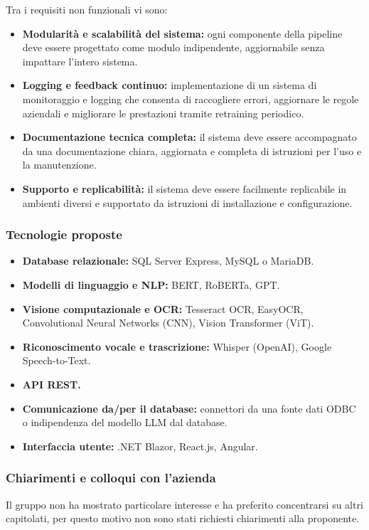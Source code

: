 \documentclass[a4paper,11pt]{article}
\begin{document}
Tra i requisiti non funzionali vi sono:
\begin{itemize}
 \item \textbf{Modularità e scalabilità del sistema:} ogni componente della pipeline deve essere progettato come modulo indipendente, aggiornabile senza impattare l'intero sistema.
 \item \textbf{Logging e feedback continuo:} implementazione di un sistema di monitoraggio e logging che consenta di raccogliere errori, aggiornare le regole aziendali e migliorare le prestazioni tramite retraining periodico.
 \item \textbf{Documentazione tecnica completa:} il sistema deve essere accompagnato da una documentazione chiara, aggiornata e completa di istruzioni per l'uso e la manutenzione.
 \item \textbf{Supporto e replicabilità:} il sistema deve essere facilmente replicabile in ambienti diversi e supportato da istruzioni di installazione e configurazione.
\end{itemize}
\subsubsection{Tecnologie proposte}
\begin{itemize}[noitemsep, topsep=0pt]
 \item \textbf{Database relazionale:} SQL Server Express, MySQL o MariaDB.
 \item \textbf{Modelli di linguaggio e NLP:} BERT, RoBERTa, GPT.
 \item \textbf{Visione computazionale e OCR:} Tesseract OCR, EasyOCR, Convolutional Neural Networks (CNN), Vision Transformer (ViT).
 \item \textbf{Riconoscimento vocale e trascrizione:} Whisper (OpenAI), Google Speech-to-Text.
 \item \textbf{API REST.}
 \item \textbf{Comunicazione da/per il database:} connettori da una fonte dati ODBC o indipendenza del modello LLM dal database.
 \item \textbf{Interfaccia utente:} .NET Blazor, React.js, Angular.
\end{itemize}

\subsubsection{Chiarimenti e colloqui con l'azienda}
Il gruppo non ha mostrato particolare interesse e ha preferito concentrarsi su altri capitolati, per questo motivo non sono stati richiesti chiarimenti alla proponente.
\end{document}
